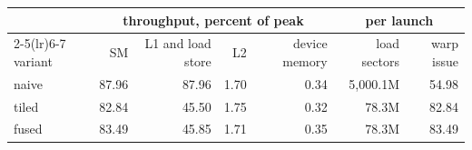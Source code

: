 \begin{tabular}{l rrrr rr}
\toprule
& \multicolumn{4}{c}{throughput, percent of peak} & \multicolumn{2}{c}{per launch} \\
\cmidrule(lr){2-5}\cmidrule(lr){6-7}
variant & SM & L1 and load store & L2 & device memory & load sectors & warp issue \\
\midrule
naive & 87.96 & 87.96 & 1.70 & 0.34 & 5,000.1M & 54.98 \\
tiled & 82.84 & 45.50 & 1.75 & 0.32 & 78.3M & 82.84 \\
fused & 83.49 & 45.85 & 1.71 & 0.35 & 78.3M & 83.49 \\
\bottomrule
\end{tabular}
